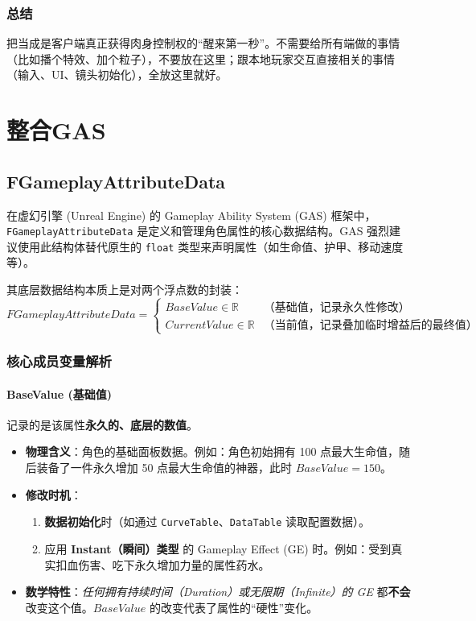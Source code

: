 \subsection{总结}
把当成是客户端真正获得肉身控制权的“醒来第一秒”。不需要给所有端做的事情（比如播个特效、加个粒子），不要放在这里；跟本地玩家交互直接相关的事情（输入、UI、镜头初始化），全放这里就好。

\chapter{整合GAS}
\section{FGameplayAttributeData}
在虚幻引擎 (Unreal Engine) 的 Gameplay Ability System (GAS) 框架中，\texttt{FGameplayAttributeData} 是定义和管理角色属性的核心数据结构。GAS 强烈建议使用此结构体替代原生的 \texttt{float} 类型来声明属性（如生命值、护甲、移动速度等）。

其底层数据结构本质上是对两个浮点数的封装：
\begin{equation*}
	FGameplayAttributeData = \begin{cases}
		BaseValue \in \mathbb{R} & \text{（基础值，记录永久性修改）} \\
		CurrentValue \in \mathbb{R} & \text{（当前值，记录叠加临时增益后的最终值）}
	\end{cases}
\end{equation*}

\subsection{核心成员变量解析}

\subsubsection{BaseValue (基础值)}
 记录的是该属性\textbf{永久的、底层的数值}。
\begin{itemize}
	\item \textbf{物理含义}：角色的基础面板数据。例如：角色初始拥有 100 点最大生命值，随后装备了一件永久增加 50 点最大生命值的神器，此时 $BaseValue = 150$。
	\item \textbf{修改时机}：
	\begin{enumerate}
		\item \textbf{数据初始化}时（如通过 \texttt{CurveTable}、\texttt{DataTable} 读取配置数据）。
		\item 应用 \textbf{Instant（瞬间）类型} 的 Gameplay Effect (GE) 时。例如：受到真实扣血伤害、吃下永久增加力量的属性药水。
	\end{enumerate}
	\item \textbf{数学特性}：\emph{任何拥有持续时间（Duration）或无限期（Infinite）的 GE} 都\textbf{不会}改变这个值。$BaseValue$ 的改变代表了属性的“硬性”变化。
\end{itemize}

